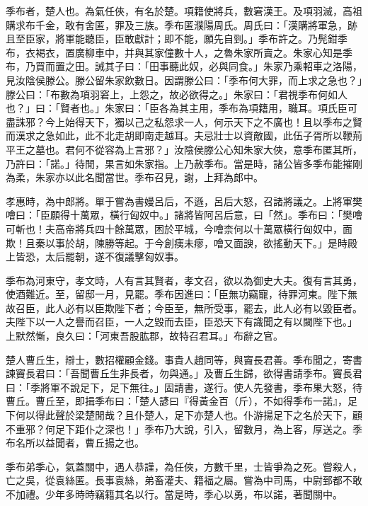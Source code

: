 
\begin{pinyinscope}
季布者，楚人也。為氣任俠，有名於楚。項籍使將兵，數窘漢王。及項羽滅，高祖購求布千金，敢有舍匿，罪及三族。季布匿濮陽周氏。周氏曰：「漢購將軍急，跡且至臣家，將軍能聽臣，臣敢獻計；即不能，願先自剄。」季布許之。乃髡鉗季布，衣褐衣，置廣柳車中，并與其家僮數十人，之魯朱家所賣之。朱家心知是季布，乃買而置之田。誡其子曰：「田事聽此奴，必與同食。」朱家乃乘軺車之洛陽，見汝陰侯滕公。滕公留朱家飲數日。因謂滕公曰：「季布何大罪，而上求之急也？」滕公曰：「布數為項羽窘上，上怨之，故必欲得之。」朱家曰：「君視季布何如人也？」曰：「賢者也。」朱家曰：「臣各為其主用，季布為項籍用，職耳。項氏臣可盡誅邪？今上始得天下，獨以己之私怨求一人，何示天下之不廣也！且以季布之賢而漢求之急如此，此不北走胡即南走越耳。夫忌壯士以資敵國，此伍子胥所以鞭荊平王之墓也。君何不從容為上言邪？」汝陰侯滕公心知朱家大俠，意季布匿其所，乃許曰：「諾。」待閒，果言如朱家指。上乃赦季布。當是時，諸公皆多季布能摧剛為柔，朱家亦以此名聞當世。季布召見，謝，上拜為郎中。

孝惠時，為中郎將。單于嘗為書嫚呂后，不遜，呂后大怒，召諸將議之。上將軍樊噲曰：「臣願得十萬眾，橫行匈奴中。」諸將皆阿呂后意，曰「然」。季布曰：「樊噲可斬也！夫高帝將兵四十餘萬眾，困於平城，今噲柰何以十萬眾橫行匈奴中，面欺！且秦以事於胡，陳勝等起。于今創痍未瘳，噲又面諛，欲搖動天下。」是時殿上皆恐，太后罷朝，遂不復議擊匈奴事。

季布為河東守，孝文時，人有言其賢者，孝文召，欲以為御史大夫。復有言其勇，使酒難近。至，留邸一月，見罷。季布因進曰：「臣無功竊寵，待罪河東。陛下無故召臣，此人必有以臣欺陛下者；今臣至，無所受事，罷去，此人必有以毀臣者。夫陛下以一人之譽而召臣，一人之毀而去臣，臣恐天下有識聞之有以闚陛下也。」上默然慚，良久曰：「河東吾股肱郡，故特召君耳。」布辭之官。

楚人曹丘生，辯士，數招權顧金錢。事貴人趙同等，與竇長君善。季布聞之，寄書諫竇長君曰：「吾聞曹丘生非長者，勿與通。」及曹丘生歸，欲得書請季布。竇長君曰：「季將軍不說足下，足下無往。」固請書，遂行。使人先發書，季布果大怒，待曹丘。曹丘至，即揖季布曰：「楚人諺曰『得黃金百（斤），不如得季布一諾』，足下何以得此聲於梁楚閒哉？且仆楚人，足下亦楚人也。仆游揚足下之名於天下，顧不重邪？何足下距仆之深也！」季布乃大說，引入，留數月，為上客，厚送之。季布名所以益聞者，曹丘揚之也。

季布弟季心，氣蓋關中，遇人恭謹，為任俠，方數千里，士皆爭為之死。嘗殺人，亡之吳，從袁絲匿。長事袁絲，弟畜灌夫、籍福之屬。嘗為中司馬，中尉郅都不敢不加禮。少年多時時竊籍其名以行。當是時，季心以勇，布以諾，著聞關中。


\end{pinyinscope}
